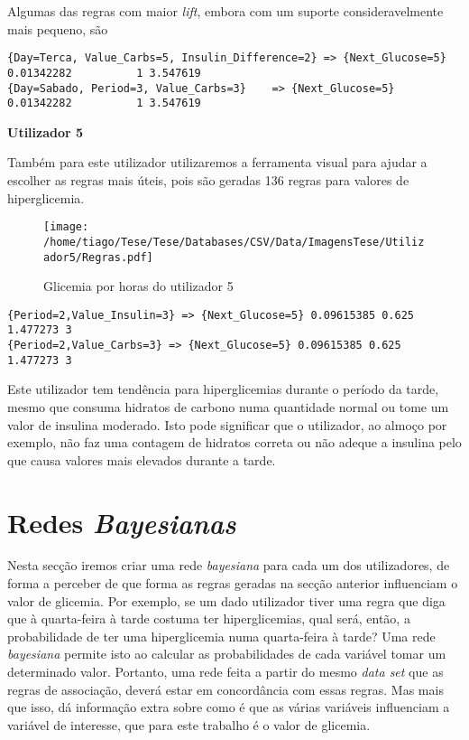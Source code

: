Algumas das regras com maior \textit{lift}, embora com um suporte consideravelmente mais pequeno, são

\begin{lstlisting}
{Day=Terca, Value_Carbs=5, Insulin_Difference=2} => {Next_Glucose=5} 0.01342282          1 3.547619
{Day=Sabado, Period=3, Value_Carbs=3}    => {Next_Glucose=5} 0.01342282          1 3.547619
\end{lstlisting}



\textbf{Utilizador 5}

Também para este utilizador utilizaremos a ferramenta visual para ajudar a escolher as regras mais úteis, pois são geradas 136 regras para valores de hiperglicemia. 

\begin{figure}[H]
\centering
\texttt{[image: /home/tiago/Tese/Tese/Databases/CSV/Data/ImagensTese/Utilizador5/Regras.pdf]}
\caption{Glicemia por horas do utilizador 5}
\end{figure}


\begin{lstlisting}
{Period=2,Value_Insulin=3} => {Next_Glucose=5} 0.09615385 0.625      1.477273 3    
{Period=2,Value_Carbs=3} => {Next_Glucose=5} 0.09615385 0.625      1.477273 3    
\end{lstlisting}

Este utilizador tem tendência para hiperglicemias durante o período da tarde, mesmo que consuma hidratos de carbono numa quantidade normal ou tome um valor de insulina moderado. Isto pode significar que o utilizador, ao almoço por exemplo, não faz uma contagem de hidratos correta ou não adeque a insulina pelo que causa valores mais elevados durante a tarde. 

\section{Redes \textit{Bayesianas}}

Nesta secção iremos criar uma rede \textit{bayesiana} para cada um dos utilizadores, de forma a perceber de que forma as regras geradas na secção anterior influenciam o valor de glicemia. Por exemplo, se um dado utilizador tiver uma regra que diga que à quarta-feira à tarde costuma ter hiperglicemias, qual será, então, a probabilidade de ter uma hiperglicemia numa quarta-feira à tarde? Uma rede \textit{bayesiana} permite isto ao calcular as probabilidades de cada variável tomar um determinado valor. Portanto, uma rede feita a partir do mesmo \textit{data set} que as regras de associação, deverá estar em concordância com essas regras. Mas mais que isso, dá informação extra sobre como é que as várias variáveis influenciam a variável de interesse, que para este trabalho é o valor de glicemia.

